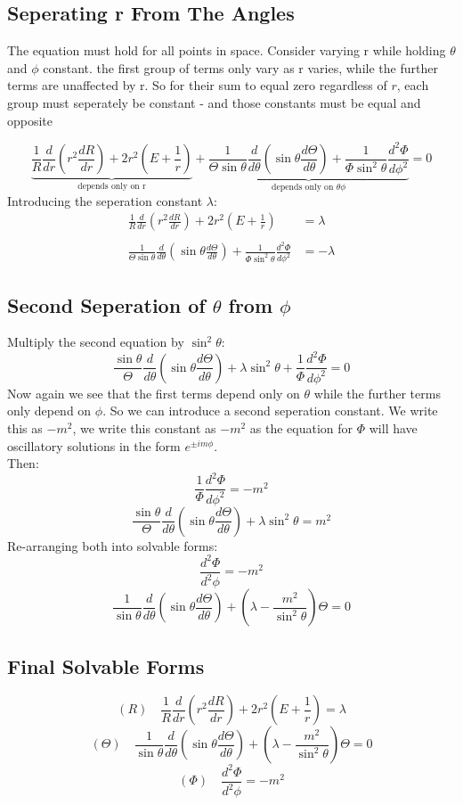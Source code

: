 \documentclass{article}
\begin{document}
\subsection{Seperating r From The Angles}
The equation must hold for all points in space. Consider varying r while holding $\theta$ and $\phi$ constant. the first group of terms only vary as r varies, while the further terms are unaffected by r. So for their sum to equal zero regardless of $r$, each group must seperately be constant - and those constants must be equal and opposite

\[
  \underbrace{\frac{1}{R}\frac{d}{dr}\!\left(r^2\frac{dR}{dr}\right)+ 2r^2\left(E + \frac{1}{r}\right)}_{\text{depends only on r}}
  + 
  \underbrace{\frac{1}{\Theta\sin\theta}\frac{d}{d\theta}\!\left(\sin\theta\frac{d\Theta}{d\theta}\right)+ \frac{1}{\Phi\sin^2\theta}\frac{d^2\Phi}{d\phi^2}}_{\text{depends only on $\theta\phi$}}
  = 0
\]
Introducing the seperation constant $\lambda$:
\begin{align*}
\frac{1}{R}\frac{d}{dr}\!\left(r^2\frac{dR}{dr}\right)+ 2r^2\left(E + \frac{1}{r}\right) &= \lambda\\\\
\frac{1}{\Theta\sin\theta}\frac{d}{d\theta}\!\left(\sin\theta\frac{d\Theta}{d\theta}\right)+ \frac{1}{\Phi\sin^2\theta}\frac{d^2\Phi}{d\phi^2} &= -\lambda
\end{align*}
\subsection{Second Seperation of $\theta$ from $\phi$}
Multiply the second equation by $\sin^2\theta$:
\[
\frac{\sin\theta}{\Theta}\frac{d}{d\theta}(\sin\theta\frac{d\Theta}{d\theta}) + \lambda\sin^2\theta + \frac{1}{\Phi}\frac{d^2\Phi}{d\phi^2} =0 
\]
Now again we see that the first terms depend only on $\theta$ while the further terms only depend on $\phi$. So we can introduce a second seperation constant. We write this as $-m^2$, we write this constant as $-m^2$ as the equation for $\Phi$ will have oscillatory solutions in the form $e^{\pm im\phi}$.\\
Then:
\[
\frac{1}{\Phi}\frac{d^2\Phi}{d\phi^2} =-m^2
\]
\[
\frac{\sin\theta}{\Theta}\frac{d}{d\theta}(\sin\theta\frac{d\Theta}{d\theta}) + \lambda\sin^2\theta = m^2
\]
Re-arranging both into solvable forms:
\[
\frac{d^2\Phi}{d^2\phi} = -m^2
\]
\[
\frac{1}{\sin\theta}\frac{d}{d\theta}\!\left(\sin\theta\frac{d\Theta}{d\theta}\right)
  + \left(\lambda - \frac{m^2}{\sin^2\theta}\right)\Theta = 0
\]
\newpage
\subsection{Final Solvable Forms}
\[ (R) \quad\frac{1}{R}\frac{d}{dr}\!\left(r^2\frac{dR}{dr}\right)+ 2r^2\left(E + \frac{1}{r}\right) = \lambda \]
\[ (\Theta) \quad \frac{1}{\sin\theta}\frac{d}{d\theta}\!\left(\sin\theta\frac{d\Theta}{d\theta}\right)
  + \left(\lambda - \frac{m^2}{\sin^2\theta}\right)\Theta = 0\]
\[(\Phi) \quad \frac{d^2\Phi}{d^2\phi} = -m^2\]
\end{document}
